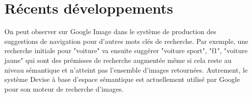 \section{R\'{e}cents d\'{e}veloppements}

On peut observer sur Google Image dans le système de production des suggestions
de navigation pour d'autres mots clés de recherche. Par exemple, une recherche
initiale pour "voiture" va ensuite suggérer "voiture sport", "f1", "voiture
jaune" qui sont des prémisses de recherche augmentée même si cela reste au
niveau sémantique et n'atteint pas l'ensemble d'images retournées.  Autrement,
le système Devise \citep{samy-extreme} à base d'espace sémantique est
actuellement utilisé par Google pour son moteur de recherche d'images.

